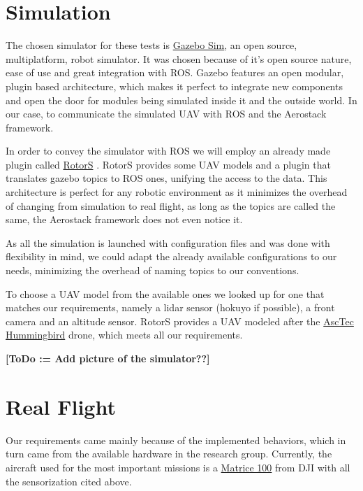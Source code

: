 \section{Simulation} \label{ch_5:sect:simulation}

  The chosen simulator for these tests is \href{http://gazebosim.org/}{Gazebo Sim}, an open source, multiplatform, robot simulator. It was chosen because of it's open source nature, ease of use and great integration with ROS. Gazebo features an open modular, plugin based architecture, which makes it perfect to integrate new components and open the door for modules being simulated inside it and the outside world. In our case, to communicate the simulated UAV with ROS and the Aerostack framework.

  In order to convey the simulator with ROS we will employ an already made plugin called \href{https://github.com/ethz-asl/rotors_simulator/wiki}{RotorS} \cite{rotors2016}. RotorS provides some UAV models and a plugin that translates gazebo topics to ROS ones, unifying the access to the data. This architecture is perfect for any robotic environment as it minimizes the overhead of changing from simulation to real flight, as long as the topics are called the same, the Aerostack framework does not even notice it.

  As all the simulation is launched with configuration files and was done with flexibility in mind, we could adapt the already available configurations to our needs, minimizing the overhead of naming topics to our conventions.

  To choose a UAV model from the available ones we looked up for one that matches our requirements, namely a lidar sensor (hokuyo if possible), a front camera and an altitude sensor. RotorS provides a UAV modeled after the \href{http://www.asctec.de/en/uav-uas-drones-rpas-roav/asctec-hummingbird/}{AscTec Hummingbird} drone, which meets all our requirements.

  \textbf{[ToDo := Add picture of the simulator??]}

\section{Real Flight} \label{ch_5:sect:real_flight}

  Our requirements came mainly because of the implemented behaviors, which in turn came from the available hardware in the research group. Currently, the aircraft used for the most important missions is a \href{https://www.dji.com/es/matrice100}{Matrice 100} from DJI with all the sensorization cited above.


